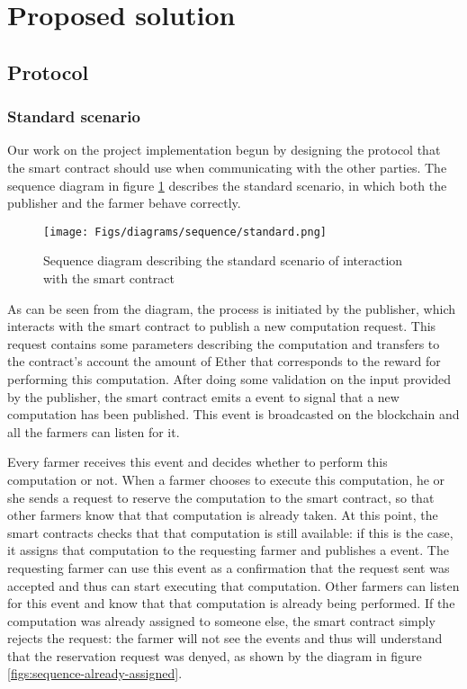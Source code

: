 
\section{Proposed solution}
\label{sect:proposed-solution}

\subsection{Protocol}
\label{sect:protocol}

\subsubsection{Standard scenario}
Our work on the project implementation begun by designing the protocol that the smart contract should use when communicating with the other parties. The sequence diagram in figure \ref{figs:sequence-standard} describes the standard scenario, in which both the publisher and the farmer behave correctly. 

\begin{figure}
\caption[Standard scenario]{Sequence diagram describing the standard scenario of interaction with the smart contract}
\label{figs:sequence-standard}
\begin{center}
    \texttt{[image: Figs/diagrams/sequence/standard.png]}
\end{center}
\end{figure}

As can be seen from the diagram, the process is initiated by the publisher, which interacts with the smart contract to publish a new computation request. This request contains some parameters describing the computation and transfers to the contract's account the amount of Ether that corresponds to the reward for performing this computation. After doing some validation on the input provided by the publisher, the smart contract emits a  event to signal that a new computation has been published. This event is broadcasted on the blockchain and all the farmers can listen for it.

Every farmer receives this event and decides whether to perform this computation or not. When a farmer chooses to execute this computation, he or she sends a request to reserve the computation to the smart contract, so that other farmers know that that computation is already taken. At this point, the smart contracts checks that that computation is still available: if this is the case, it assigns that computation to the requesting farmer and publishes a  event. The requesting farmer can use this event as a confirmation that the request sent was accepted and thus can start executing that computation. Other farmers can listen for this event and know that that computation is already being performed. If the computation was already assigned to someone else, the smart contract simply rejects the request: the farmer will not see the  events and thus will understand that the reservation request was denyed, as shown by the diagram in figure \ref{figs:sequence-already-assigned}.

